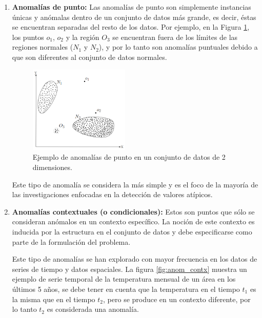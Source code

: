 \begin{enumerate}[1.]

\item \textbf{Anomal\'{i}as de punto: }Las anomalías de punto son simplemente instancias únicas y anómalas dentro de un conjunto de datos más grande, es decir, \'{e}stas se encuentran separadas del resto de los datos. Por ejemplo, en la Figura \ref{fig:anom_2D}, los puntos $o_1$, $o_2$ y la regi\'{o}n $O_3$ se encuentran fuera de los l\'{i}mites de las regiones normales ($N_1$ y $N_2$), y por lo tanto son anomal\'{i}as puntuales debido a que son diferentes al conjunto de datos normales.

\begin{figure}[h!]
  \begin{center}	\includegraphics[width=0.45\textwidth]{imagenes/Cap2/anom_2D}
  \caption{Ejemplo de anomal\'{i}as de punto en un conjunto de datos de 2 dimensiones.}
  \label{fig:anom_2D}
  \end{center}
\end{figure}

\vspace{5mm} %

Este tipo de anomal\'{i}a se considera la m\'{a}s simple y es el foco de la mayor\'{i}a de las investigaciones enfocadas en la detecci\'{o}n de valores at\'{i}picos.

\item \textbf{Anomal\'{i}as contextuales (o condicionales): }Estos son puntos que s\'{o}lo se consideran anómalos en un contexto espec\'{i}fico. La noci\'{o}n de este contexto es inducida por la estructura en el conjunto de datos y debe especificarse como parte de la formulaci\'{o}n del problema.

\vspace{5mm} %

Este tipo de anomal\'{i}as se han explorado con mayor frecuencia en los datos de series de tiempo y datos espaciales. La figura \ref{fig:anom_contx} muestra un ejemplo de serie temporal de la temperatura mensual de un \'{a}rea en los \'{u}ltimos 5 a\~{n}os, se debe tener en cuenta que la temperatura en el tiempo $t_1$ es la misma que en el tiempo $t_2$, pero se produce en un contexto diferente, por lo tanto $t_2$ es considerada una anomal\'{i}a.


\end{enumerate}
